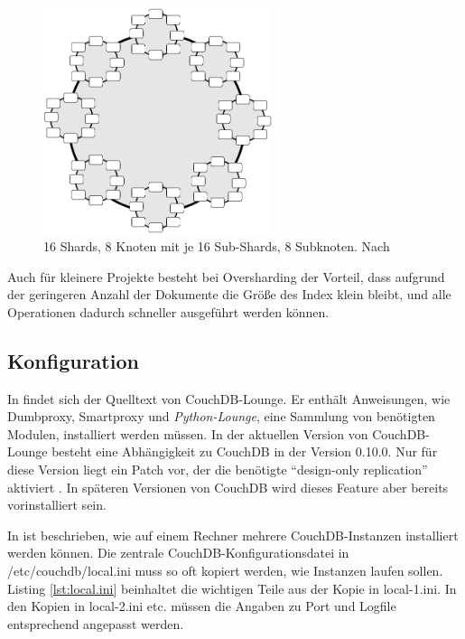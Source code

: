 \medskip
\begin{figure}[H] 
  \begin{center}
    \includegraphics[width=0.6\textwidth]{grafik/shards2} 
  \end{center}
  \caption[16 Shards, 8 Knoten mit je 16 Sub-Shards, 8 Subknoten]{16 Shards, 8 Knoten mit je 16 Sub-Shards, 8 Subknoten. Nach }
  \label{fig:lounge-scaling2} 
\end{figure}

Auch für kleinere Projekte besteht bei Oversharding der Vorteil, dass aufgrund der geringeren Anzahl der Dokumente die Größe des Index klein bleibt, und alle Operationen dadurch schneller ausgeführt werden können. 


\subsection{Konfiguration}
\label{subsec:lounge-install}

In \cite{lounge:website} findet sich der Quelltext von CouchDB-Lounge. Er enthält Anweisungen, wie Dumbproxy, Smartproxy und \textit{Python-Lounge}, eine Sammlung von benötigten Modulen, installiert werden müssen. In der aktuellen Version von CouchDB-Lounge besteht eine Abhängigkeit zu CouchDB in der Version 0.10.0. Nur für diese Version liegt ein Patch vor, der die benötigte \enquote{design-only replication} aktiviert \cite{lounge:wiki}. In späteren Versionen von CouchDB wird dieses Feature aber bereits vorinstalliert sein. 

In \cite{lounge:twoinstances} ist beschrieben, wie auf einem Rechner mehrere CouchDB-Instanzen installiert werden können. Die zentrale CouchDB-Konfigurationsdatei in {\selectfont /etc/couchdb/local.ini} muss so oft kopiert werden, wie Instanzen laufen sollen. Listing \ref{lst:local.ini} beinhaltet die wichtigen Teile aus der Kopie in {\selectfont local-1.ini}. In den Kopien in {\selectfont local-2.ini} etc. müssen die Angaben zu Port und Logfile entsprechend angepasst werden.
 
